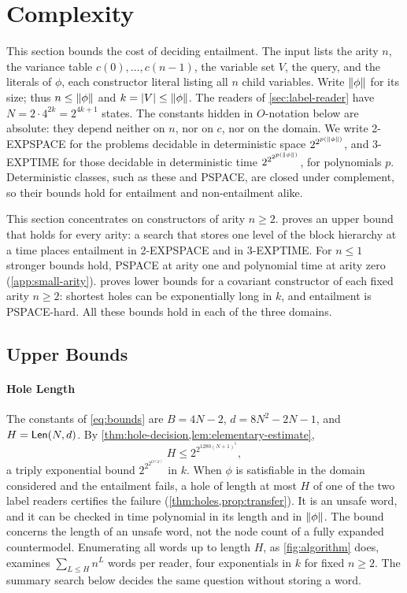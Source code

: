 \section{Complexity}
\label{sec:complexity}

This section bounds the cost of deciding entailment. The input lists the
arity $n$, the variance table $c(0),\ldots,c(n-1)$, the variable set $V$, the
query, and the literals of $\phi$, each constructor literal listing all $n$
child variables. Write $\|\phi\|$ for its size; thus $n\le\|\phi\|$ and
$k=|V|\le\|\phi\|$. The readers of \cref{sec:label-reader} have
$N=2\cdot4^{2k}=2^{4k+1}$ states. The constants hidden in $O$-notation below
are absolute: they depend neither on $n$, nor on $c$, nor on the domain. We
write 2-EXPSPACE for the problems decidable in deterministic space
$2^{2^{p(\|\phi\|)}}$, and 3-EXPTIME for those decidable in deterministic
time $2^{2^{2^{p(\|\phi\|)}}}$, for polynomials $p$. Deterministic
classes, such as these and PSPACE, are closed under complement, so their
bounds hold for entailment and non-entailment alike.

This section concentrates on constructors of arity $n\ge2$.
 proves an upper bound that holds for every
arity: a search that stores one level of the block hierarchy at a time places
entailment in 2-EXPSPACE and in 3-EXPTIME. For $n\le1$ stronger bounds hold,
PSPACE at arity one and polynomial time at arity zero
(\cref{app:small-arity}).  proves lower bounds for
a covariant constructor of each fixed arity $n\ge2$: shortest holes can be
exponentially long in $k$, and entailment is PSPACE-hard. All these bounds
hold in each of the three domains.

\subsection{Upper Bounds}
\label{sec:complexity-upper}

\paragraph{Hole Length}
The constants of \eqref{eq:bounds} are $B=4N-2$, $d=8N^2-2N-1$, and
$H=\mathsf{Len}(N,d)$. By \cref{thm:hole-decision,lem:elementary-estimate},
\[
 H\le2^{2^{1280(N+1)^5}},
\]
a triply exponential bound $2^{2^{2^{O(k)}}}$ in $k$. When $\phi$ is
satisfiable in the domain considered and the entailment fails, a hole of
length at most $H$ of one of the two label readers certifies the failure
(\cref{thm:holes,prop:transfer}). It is an unsafe word, and it can be checked
in time polynomial in its length and in $\|\phi\|$. The bound concerns the
length of an unsafe word, not the node count of a fully expanded
countermodel. Enumerating all words up to length $H$, as \cref{fig:algorithm}
does, examines $\sum_{L\le H}n^L$ words per reader, four exponentials in $k$
for fixed $n\ge2$. The summary search below decides the same question without
storing a word.

